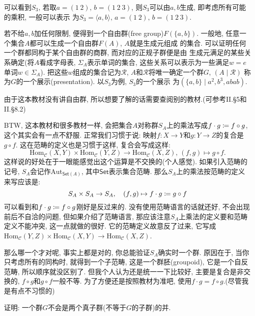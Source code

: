 \begin{remark}
    可以看到$S_3$, 若取$a = (1\:2),\, b = (1\:2\:3)$,
则$S_3$可以由$a, b$生成, 即考虑所有可能的乘积, 一般可以表示
为$S_3 = \langle a, b \rangle,\, a = (1\:2),\, b = (1\:2\:3)$.

若不给$a, b$加任何限制, 便得到一个自由群(free group)$F(\{a, b\})$.
一般地, 任意一个集合$A$都可以生成一个自由群$F(A)$, $A$就是生成元组成
的集合. 可以证明任何一个群都同构于某个自由群的商群, 而对应的正规子群便是由
生成元满足的某些关系确定(将$A$看成字母表, $\Sigma_A$表示单词的集合,
这些关系可以表示为一些满足$w = e$单词$w \in \Sigma_A$).
把这些$w$组成的集合记为$\mathscr{R}$,
$A$和$\mathscr{R}$将唯一确定一个群$G$, $(A \mid \mathscr{R})$
称为$G$的一个展示(presentation). 以$S_3$为例, $S_3$的一个展示
为$(\{a, b\} \mid a^2, b^3, abab)$.

由于这本教材没有讲自由群, 所以想要了解的话需要查阅别的教材.(可参考\cite{aluffi2009algebra}II.\S5和II.\S8.2)

BTW, 这本教材和很多教材一样, 会把集合$A$对称群$S_A$上的乘法写成$f \cdot g \mathrel{\coloneqq} f \circ g$, 这个其实会有一点不舒服. 正常我们习惯于说: 映射$f:X \to Y$和$g:Y \to Z$的复合是$g \circ f$. 这在范畴的定义也是习惯于这样, 复合会写成这样:
\[
    \mathrm{Hom}_{\mathcal{C}}(X, Y) \times \mathrm{Hom}_{\mathcal{C}}(Y, Z) \to \mathrm{Hom}_{\mathcal{C}}(X, Z),\, (f, g) \mapsto g \circ f.
\]
这样说的好处在于一眼能感觉出这个运算是不交换的(个人感觉). 如果引入范畴的记号, $S_A$会记作$\mathrm{Aut}_{\mathsf{Set}(A)}$, 其中$\mathsf{Set}$表示集合范畴. 那么$S_A$上的乘法按范畴的定义来写应该是:
\[
    S_A \times S_A \to S_A,\quad (f, g) \mapsto f \cdot g \mathrel{\coloneqq} g \circ f
\]
可以看到和$f \cdot g \mathrel{\coloneqq} f \circ g$刚好是反过来的. 没有使用范畴语言的话就还好, 不会出现前后不自洽的问题, 但如果介绍了范畴语言, 那应该注意$S_A$上乘法的定义要和范畴定义不能冲突, 这一点\cite{hungerford2003algebra}就做的很好. 它的范畴定义故意反了过来, 它写成$\mathrm{Hom}_{\mathcal{C}}(Y, Z) \times \mathrm{Hom}_{\mathcal{C}}(X, Y) \to \mathrm{Hom}_{\mathcal{C}}(X, Z)$.

那么哪一个才对呢, 事实上都是对的, 你总能验证$S_A$确实时一个群. 原因在于, 当你只考虑所有的同构时, 就得到一个子范畴, 这是一个群胚(groupoid), 它是一个自反范畴, 所以顺序就没区别了. 但我个人认为还是统一一下比较好, 主要是复合是非交换的, $f \circ g$和$g \circ f$一般不等. 为了方便还是按照教材为准吧, 使用$f \cdot g = f \circ g$.(尽管我是有点不习惯的)
\end{remark}

\begin{problem}
    证明: 一个群$G$不会是两个真子群(不等于$G$的子群)的并.
\end{problem}


